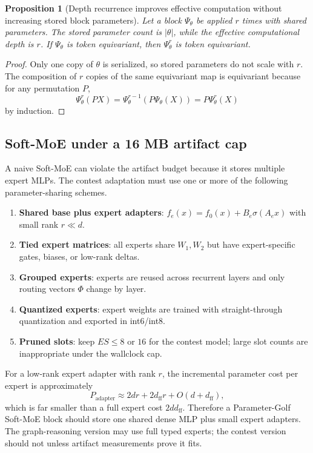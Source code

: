 \documentclass[11pt]{article}
\theoremstyle{definition}
\theoremstyle{plain}
\newtheorem{proposition}[definition]{Proposition}
\theoremstyle{remark}
\numberwithin{equation}{section}
\begin{document}
\begin{proposition}[Depth recurrence improves effective computation without increasing stored block parameters]
Let a block $\Psi_\theta$ be applied $r$ times with shared parameters.  The stored parameter count is $|\theta|$, while the effective computational depth is $r$.  If $\Psi_\theta$ is token equivariant, then $\Psi_\theta^r$ is token equivariant.
\end{proposition}

\begin{proof}
Only one copy of $\theta$ is serialized, so stored parameters do not scale with $r$.  The composition of $r$ copies of the same equivariant map is equivariant because for any permutation $P$,
\begin{equation}
  \Psi_\theta^r(PX)=\Psi_\theta^{r-1}(P\Psi_\theta(X))=P\Psi_\theta^r(X)
\end{equation}
by induction.
\end{proof}

\subsection{Soft-MoE under a 16 MB artifact cap}

A naive Soft-MoE can violate the artifact budget because it stores multiple expert MLPs.  The contest adaptation must use one or more of the following parameter-sharing schemes.
\begin{enumerate}[leftmargin=2em]
  \item \textbf{Shared base plus expert adapters}: $f_e(x)=f_0(x)+B_e\sigma(A_e x)$ with small rank $r\ll d$.
  \item \textbf{Tied expert matrices}: all experts share $W_1,W_2$ but have expert-specific gates, biases, or low-rank deltas.
  \item \textbf{Grouped experts}: experts are reused across recurrent layers and only routing vectors $\Phi$ change by layer.
  \item \textbf{Quantized experts}: expert weights are trained with straight-through quantization and exported in int6/int8.
  \item \textbf{Pruned slots}: keep $E S\le8$ or $16$ for the contest model; large slot counts are inappropriate under the wallclock cap.
\end{enumerate}

For a low-rank expert adapter with rank $r$, the incremental parameter cost per expert is approximately
\begin{equation}
  P_{\mathrm{adapter}}\approx 2dr+2d_{\mathrm{ff}}r+O(d+d_{\mathrm{ff}}),
\end{equation}
which is far smaller than a full expert cost $2dd_{\mathrm{ff}}$.  Therefore a Parameter-Golf Soft-MoE block should store one shared dense MLP plus small expert adapters.  The graph-reasoning version may use full typed experts; the contest version should not unless artifact measurements prove it fits.
\end{document}
